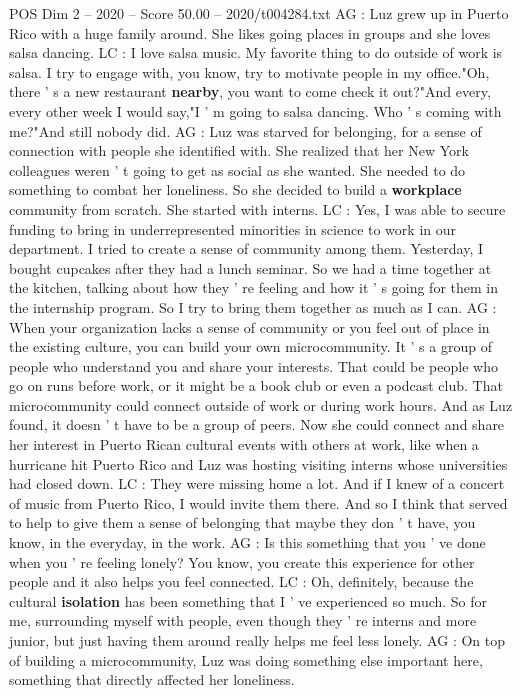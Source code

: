 \begin{textsample}{POS Dim 2 – 2020 – Score 50.00 – 2020/t004284.txt}
AG : Luz grew up in Puerto Rico with a huge family around.
She likes going places in groups and she loves salsa dancing.
LC : I love salsa music.
My favorite thing to do outside of work is salsa.
I try to engage with, you know, try to motivate people in my office."Oh, there ' s a new restaurant \textbf{nearby}, you want to come check it out?"And every, every other week I would say,"I ' m going to salsa dancing.
Who ' s coming with me?"And still nobody did.
AG : Luz was starved for belonging, for a sense of connection with people she identified with.
She realized that her New York colleagues weren ' t going to get as social as she wanted.
She needed to do something to combat her loneliness.
So she decided to build a \textbf{workplace} community from scratch.
She started with interns.
LC : Yes, I was able to secure funding to bring in underrepresented minorities in science to work in our department.
I tried to create a sense of community among them.
Yesterday, I bought cupcakes after they had a lunch seminar.
So we had a time together at the kitchen, talking about how they ' re feeling and how it ' s going for them in the internship program.
So I try to bring them together as much as I can.
AG : When your organization lacks a sense of community or you feel out of place in the existing culture, you can build your own microcommunity.
It ' s a group of people who understand you and share your interests.
That could be people who go on runs before work, or it might be a book club or even a podcast club.
That microcommunity could connect outside of work or during work hours.
And as Luz found, it doesn ' t have to be a group of peers.
Now she could connect and share her interest in Puerto Rican cultural events with others at work, like when a hurricane hit Puerto Rico and Luz was hosting visiting interns whose universities had closed down.
LC : They were missing home a lot.
And if I knew of a concert of music from Puerto Rico, I would invite them there.
And so I think that served to help to give them a sense of belonging that maybe they don ' t have, you know, in the everyday, in the work.
AG : Is this something that you ' ve done when you ' re feeling lonely?
You know, you create this experience for other people and it also helps you feel connected.
LC : Oh, definitely, because the cultural \textbf{isolation} has been something that I ' ve experienced so much.
So for me, surrounding myself with people, even though they ' re interns and more junior, but just having them around really helps me feel less lonely.
AG : On top of building a microcommunity, Luz was doing something else important here, something that directly affected her loneliness.

\end{textsample}
